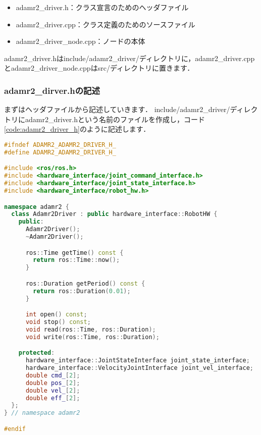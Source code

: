\documentclass[{../../master}]{subfiles}
\begin{document}
\begin{itemize}
  \item adamr2\_driver.h：クラス宣言のためのヘッダファイル
  \item adamr2\_driver.cpp：クラス定義のためのソースファイル
  \item adamr2\_driver\_node.cpp：ノードの本体
\end{itemize}

\textsf{adamr2\_driver.h}は\textsf{include/adamr2\_driver/}ディレクトリに，\textsf{adamr2\_driver.cpp}と\textsf{adamr2\_driver\_node.cpp}は\textsf{src/}ディレクトリに置きます．

\subsubsection{\textsf{adamr2\_dirver.h}の記述}

まずはヘッダファイルから記述していきます．
\textsf{include/adamr2\_driver/}ディレクトリに\textsf{adamr2\_driver.h}という名前のファイルを作成し，コード\ref{code:adamr2_driver_h}のように記述します．

\begin{lstlisting}[language=C++, label=code:adamr2_driver_h, caption=\textsf{adamr2\_driver.h}]
#ifndef ADAMR2_ADAMR2_DRIVER_H_
#define ADAMR2_ADAMR2_DRIVER_H_

#include <ros/ros.h>
#include <hardware_interface/joint_command_interface.h>
#include <hardware_interface/joint_state_interface.h>
#include <hardware_interface/robot_hw.h>

namespace adamr2 {
  class Adamr2Driver : public hardware_interface::RobotHW {
    public:
      Adamr2Driver();
      ~Adamr2Driver();

      ros::Time getTime() const {
        return ros::Time::now();
      }

      ros::Duration getPeriod() const {
        return ros::Duration(0.01);
      }

      int open() const;
      void stop() const;
      void read(ros::Time, ros::Duration);
      void write(ros::Time, ros::Duration);

    protected:
      hardware_interface::JointStateInterface joint_state_interface;
      hardware_interface::VelocityJointInterface joint_vel_interface;
      double cmd_[2];
      double pos_[2];
      double vel_[2];
      double eff_[2];
  };
} // namespace adamr2

#endif
\end{lstlisting}
\end{document}
